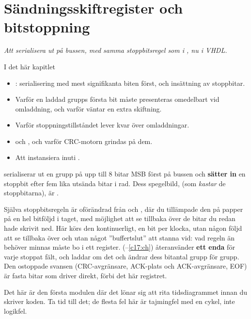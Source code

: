 
\chapter{Sändningsskiftregister och bitstoppning}
\label{c14:ch}

{\large\itshape Att serialisera ut på bussen, med samma stoppbitsregel som i , nu i
VHDL.\par}

\begin{chapterbox}{I det här kapitlet}
\begin{itemize}
  \item {}: serialisering med mest signifikanta biten först, och insättning av
    stoppbitar.
  \item Varför en laddad grupps första bit måste presenteras omedelbart vid omladdning, och varför
     väntar en extra skiftning.
  \item Varför stoppningstillståndet lever kvar över omladdningar.
  \item {} och , och varför CRC-motorn grindas på dem.
  \item Att instansiera  inuti .
\end{itemize}
\end{chapterbox}

 serialiserar ut en grupp på upp till 8 bitar MSB först på bussen och \textbf{sätter
in} en stoppbit efter fem lika utsända bitar i rad. Dess spegelbild,  (som
\emph{kastar} de stoppbitarna), är .

Själva stoppbitsregeln är oförändrad från  och , där du
tillämpade den på papper på en hel bitföljd i taget, med möjlighet att se tillbaka över de bitar du
redan hade skrivit ned.
Här körs den kontinuerligt, en bit per klocka, utan någon följd att se tillbaka över och utan något
”buffertslut” att stanna vid: vad regeln än behöver minnas måste bo i ett register.
 (--\ref{c17:ch}) återanvänder \textbf{ett enda}
 för varje stoppat fält, och laddar om det och ändrar dess bitantal grupp för
grupp. Den ostoppade svansen (CRC-avgränsare, ACK-plats och ACK-avgränsare, EOF) är fasta bitar som
 driver direkt, förbi det här registret.

Det här är den första modulen där det lönar sig att rita tidsdiagrammet innan du skriver koden. Ta
tid till det; de flesta fel här är tajmingfel med en cykel, inte logikfel.




